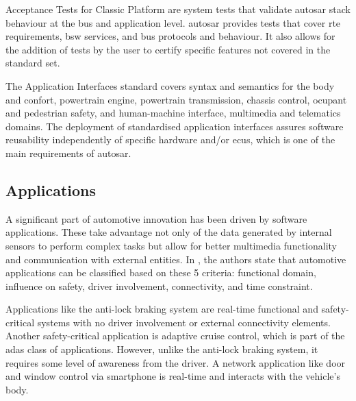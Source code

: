 Acceptance Tests for Classic Platform are system tests that validate \gls{autosar} stack behaviour at the bus and application level. \gls{autosar} provides tests that cover \gls{rte} requirements, \gls{bsw} services, and bus protocols and behaviour. It also allows for the addition of tests by the user to certify specific features not covered in the standard set.\par

The Application Interfaces standard covers syntax and semantics for the body and confort, powertrain engine, powertrain transmission, chassis control, ocupant and pedestrian safety, and human-machine interface, multimedia and telematics domains. The deployment of standardised application interfaces assures software reusability independently of specific hardware and/or \glspl{ecu}, which is one of the main requirements of \gls{autosar}.

\subsection{Applications}

A significant part of automotive innovation has been driven by software applications. These take advantage not only of the data generated by internal sensors to perform complex tasks but allow for better multimedia functionality and communication with external entities. In \cite{Le2018}, the authors state that automotive applications can be classified based on these 5 criteria: functional domain, influence on safety, driver involvement, connectivity, and time constraint.\par

Applications like the anti-lock braking system are real-time functional and safety-critical systems with no driver involvement or external connectivity elements. Another safety-critical application is adaptive cruise control, which is part of the \gls{adas} class of applications. However, unlike the anti-lock braking system, it requires some level of awareness from the driver. A network application like door and window control via smartphone is real-time and interacts with the vehicle’s body.\par


